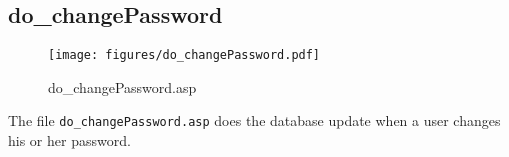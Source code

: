 \subsection{do\_changePassword}
\begin{figure}[htb]
    \begin{center}
        \texttt{[image: figures/do\_changePassword.pdf]}
    \end{center}
    \caption{do\_changePassword.asp}
    \label{fig:do_changePassword}
\end{figure}

The file \verb|do_changePassword.asp| does the database update when a user
changes his or her password.
